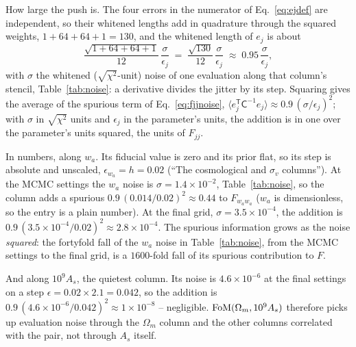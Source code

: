 \documentclass[11pt]{article}
\newcommand{\Cov}{\mathsf{C}}
\newcommand{\T}{^{\mathsf{T}}}
\begin{document}
How large the push is.  The four errors in the numerator of
Eq.~\eqref{eq:ejdef} are independent, so their whitened lengths add in
quadrature through the squared weights, $1 + 64 + 64 + 1 = 130$, and
the whitened length of $e_j$ is about
\begin{equation}
  \frac{\sqrt{1 + 64 + 64 + 1}}{12}\,\frac{\sigma}{\epsilon_j}
  \;=\; \frac{\sqrt{130}}{12}\,\frac{\sigma}{\epsilon_j}
  \;\approx\; 0.95\,\frac{\sigma}{\epsilon_j} ,
  \label{eq:derivnoise}
\end{equation}
with $\sigma$ the whitened ($\sqrt{\chi^2}$-unit) noise of one
evaluation along that column's stencil, Table~\ref{tab:noise}: a
derivative divides the jitter by its step.  Squaring gives the average
of the spurious term of Eq.~\eqref{eq:fjjnoise},
$\langle e_j\T\Cov^{-1}e_j\rangle \approx 0.9\,(\sigma/\epsilon_j)^2$;
with $\sigma$ in $\sqrt{\chi^2}$ units and $\epsilon_j$ in the
parameter's units, the addition is in one over the parameter's units
squared, the units of $F_{jj}$.

In numbers, along $w_a$.  Its fiducial value is zero and its prior
flat, so its step is absolute and unscaled,
$\epsilon_{w_a} = h = 0.02$ (``The cosmological and $\sigma_v$
columns'').  At the MCMC settings the $w_a$ noise is
$\sigma = 1.4\times10^{-2}$, Table~\ref{tab:noise}, so the column adds
a spurious $0.9\,(0.014/0.02)^2 \approx 0.44$ to $F_{w_a w_a}$ ($w_a$
is dimensionless, so the entry is a plain number).  At the final grid,
$\sigma = 3.5\times10^{-4}$, the addition is
$0.9\,(3.5\times10^{-4}/0.02)^2 \approx 2.8\times10^{-4}$.  The
spurious information grows as the noise \emph{squared}: the fortyfold
fall of the $w_a$ noise in Table~\ref{tab:noise}, from the MCMC
settings to the final grid, is a $1600$-fold fall of its spurious
contribution to $F$.

And along $10^9 A_s$, the quietest column.  Its noise is
$4.6\times10^{-6}$ at the final settings on a step
$\epsilon = 0.02 \times 2.1 = 0.042$, so the addition is
$0.9\,(4.6\times10^{-6}/0.042)^2 \approx 1\times10^{-8}$ --
negligible.  ${\rm FoM}(\Omega_m, 10^9 A_s)$ therefore picks up
evaluation noise through the $\Omega_m$ column and the other columns
correlated with the pair, not through $A_s$ itself.
\end{document}
